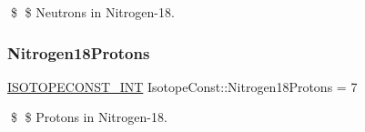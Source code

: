 \$ \$ Neutrons in Nitrogen-\/18. \mbox{\label{group___isotope_const-_nitrogen-_n18_ga448cfc67514445c052a1ecaf1ec8b10b}} 
\subsubsection{\texorpdfstring{Nitrogen18\+Protons}{Nitrogen18Protons}}
{\footnotesize\ttfamily \mbox{\hyperlink{group___isotope_const-_macros_ga5f18360b3e99483a35c32d789e62621c}{I\+S\+O\+T\+O\+P\+E\+C\+O\+N\+S\+T\+\_\+\+I\+NT}} Isotope\+Const\+::\+Nitrogen18\+Protons = 7}

\$ \$ Protons in Nitrogen-\/18. 